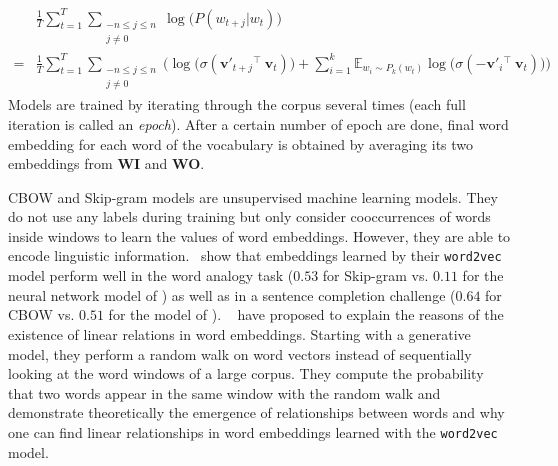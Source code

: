       \begin{equation}
        \label{ch03:eq:sgns}
        \begin{split}
          & \frac{1}{T} \sum_{t=1}^T
          \sum_{\substack{-n \leq j \leq n \\ j \neq 0}}
          \log\big(P(w_{t+j} | w_t)\big) \\
        = & \frac{1}{T} \sum_{t=1}^T
          \sum_{\substack{-n \leq j \leq n \\ j \neq 0}}
          \Big(
            \log \big( \sigma(\mathbf{v'}_{t+j} {}^\top~\mathbf{v}_{t}) \big)
            + \sum_{i=1}^k \mathbb{E}_{w_i \sim P_k(w_t)}
            \log \big( \sigma(\mathbf{-v'}_{i} {}^\top~\mathbf{v}_{t}) \big)
          \Big)
        \end{split}
      \end{equation}
      Models are trained by iterating through the corpus several times (each
      full iteration is called an \textit{epoch}). After a certain number of
      epoch are done, final word embedding for each word of the vocabulary is
      obtained by averaging its two embeddings from \textbf{WI} and \textbf{WO}.
      \medskip

      CBOW and Skip-gram models are unsupervised machine learning models. They
      do not use any labels during training but only consider cooccurrences of
      words inside windows to learn the values of word embeddings. However, they
      are able to encode linguistic information.~\citet{mikolov2013efficient}
      show that embeddings learned by their \texttt{word2vec} model perform well
      in the word analogy task ($0.53$ for Skip-gram vs. $0.11$ for the neural
      network model of \citep{collobert2008unified}) as well as in a sentence
      completion challenge ($0.64$ for CBOW vs. $0.51$ for the model of
      \citep{bengio2003neural}).
      \citeauthor{arora2015random}~\citep{arora2015random} have proposed to
      explain the reasons of the existence of linear relations in word
      embeddings. Starting with a generative model, they perform a random walk
      on word vectors instead of sequentially looking at the word windows of a
      large corpus. They compute the probability that two words appear in the
      same window with the random walk and demonstrate theoretically the
      emergence of relationships between words and why one can find linear
      relationships in word embeddings learned with the \texttt{word2vec} model.

